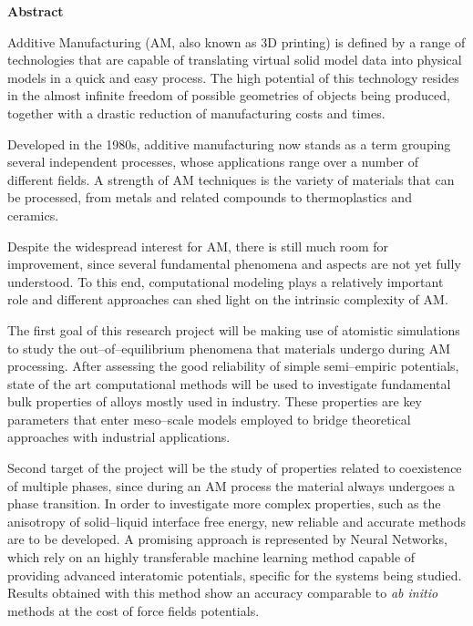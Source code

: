 \thispagestyle{empty}
\begin{center}
	{\Large\bfseries Abstract}
\end{center}

Additive Manufacturing (AM, also known as 3D printing) is defined by a range of technologies that are capable of translating virtual solid model data into physical models in a quick and easy process.
The high potential of this technology resides in the almost infinite freedom of possible geometries of objects being produced, together with a drastic reduction of manufacturing costs and times.

Developed in the 1980s, additive manufacturing now stands as a term grouping several independent processes, whose applications range over a number of different fields.  
A strength of AM techniques is the variety of materials that can be processed, from metals and related compounds to thermoplastics and ceramics.

Despite the widespread interest for AM, there is still much room for improvement, since several fundamental phenomena and aspects are not yet fully understood.
To this end, computational modeling plays a relatively important role and different approaches can shed light on the intrinsic complexity of AM.

The first goal of this research project will be making use of atomistic simulations to study the out--of--equilibrium phenomena that materials undergo during AM processing. After assessing the good reliability of simple semi--empiric potentials, state of the art computational methods will be used to investigate fundamental bulk properties of alloys mostly used in industry. These properties are key parameters that enter meso--scale models employed to bridge theoretical approaches with industrial applications.


Second target of the project will be the study of properties related to coexistence of multiple phases, since during an AM process the material always undergoes a phase transition. In order to investigate more complex properties, such as the anisotropy of solid--liquid interface free energy, new reliable and accurate methods are to be developed.
A promising approach is represented by Neural Networks, which rely on an highly transferable machine learning method capable of providing advanced interatomic potentials, specific for the systems being studied. Results obtained with this method show an accuracy comparable to \textit{ab initio} methods at the cost of force fields potentials.





